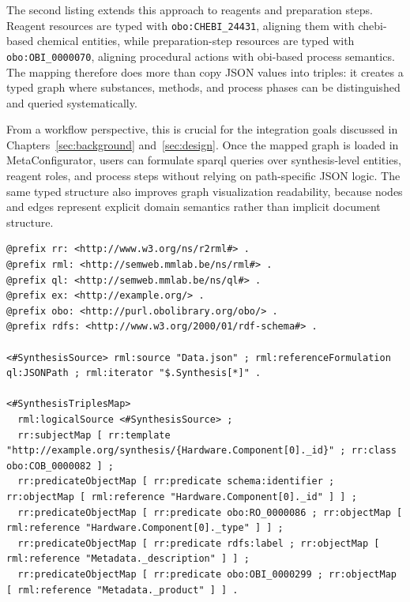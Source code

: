 The second listing extends this approach to reagents and preparation steps. Reagent resources are typed with \texttt{obo:CHEBI\_24431}, aligning them with \gls{chebi}-based chemical entities, while preparation-step resources are typed with \texttt{obo:OBI\_0000070}, aligning procedural actions with \gls{obi}-based process semantics. The mapping therefore does more than copy JSON values into triples: it creates a typed graph where substances, methods, and process phases can be distinguished and queried systematically.

From a workflow perspective, this is crucial for the integration goals discussed in Chapters~\ref{sec:background} and~\ref{sec:design}. Once the mapped graph is loaded in MetaConfigurator, users can formulate \gls{sparql} queries over synthesis-level entities, reagent roles, and process steps without relying on path-specific JSON logic. The same typed structure also improves graph visualization readability, because nodes and edges represent explicit domain semantics rather than implicit document structure.

\begin{lstlisting}[float=htbp,style=turtle,caption={Part of RML mapping focused on synthesis-level hardware and metadata},label={lst:application_mof_rml_example_1}]
@prefix rr: <http://www.w3.org/ns/r2rml#> .
@prefix rml: <http://semweb.mmlab.be/ns/rml#> .
@prefix ql: <http://semweb.mmlab.be/ns/ql#> .
@prefix ex: <http://example.org/> .
@prefix obo: <http://purl.obolibrary.org/obo/> .
@prefix rdfs: <http://www.w3.org/2000/01/rdf-schema#> .

<#SynthesisSource> rml:source "Data.json" ; rml:referenceFormulation ql:JSONPath ; rml:iterator "$.Synthesis[*]" .

<#SynthesisTriplesMap>
  rml:logicalSource <#SynthesisSource> ;
  rr:subjectMap [ rr:template "http://example.org/synthesis/{Hardware.Component[0]._id}" ; rr:class obo:COB_0000082 ] ;
  rr:predicateObjectMap [ rr:predicate schema:identifier ; rr:objectMap [ rml:reference "Hardware.Component[0]._id" ] ] ;
  rr:predicateObjectMap [ rr:predicate obo:RO_0000086 ; rr:objectMap [ rml:reference "Hardware.Component[0]._type" ] ] ;
  rr:predicateObjectMap [ rr:predicate rdfs:label ; rr:objectMap [ rml:reference "Metadata._description" ] ] ;
  rr:predicateObjectMap [ rr:predicate obo:OBI_0000299 ; rr:objectMap [ rml:reference "Metadata._product" ] ] .
\end{lstlisting}

